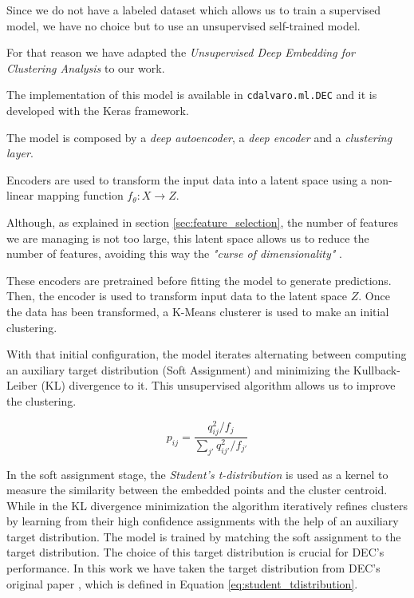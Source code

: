 \documentclass[11pt, a4paper, english]{book}
\begin{document}
Since we do not have a labeled dataset which allows us to train a supervised model, we have no choice but to use an unsupervised self-trained model.

For that reason we have adapted the \emph{Unsupervised Deep Embedding for Clustering Analysis} to our work.

The implementation of this model is available in \verb|cdalvaro.ml.DEC| and it is developed with the Keras framework.

The model is composed by a \emph{deep autoencoder}, a \emph{deep encoder} and a \emph{clustering layer}.

Encoders are used to transform the input data into a latent space using a non-linear mapping function $f_{\theta} : X \rightarrow Z$.

Although, as explained in section \ref{sec:feature_selection}, the number of features we are managing is not too large, this latent space allows us to reduce
the number of features, avoiding this way the \emph{"curse of dimensionality"} \cite{bellman1961curse}.

These encoders are pretrained before fitting the model to generate predictions. Then, the encoder is used to transform input data to the
latent space $Z$. Once the data has been transformed, a K-Means clusterer is used to make an initial clustering.

With that initial configuration, the model iterates alternating between computing an auxiliary target distribution (Soft Assignment)
and minimizing the Kullback-Leiber (KL) divergence \cite{kullback1951information} to it. This unsupervised algorithm allows us to improve
the clustering.

\begin{equation}
  p_{ij} = \frac{q^{2}_{ij} / f_{j}}{\sum_{j'}q^{2}_{ij'}/f_{j'}}
  \label{eq:student_tdistribution}
\end{equation}

In the soft assignment stage, the \emph{Student's t-distribution} is used as a kernel to measure the similarity
between the embedded points and the cluster centroid. While in the KL divergence minimization the algorithm iteratively refines clusters by learning
from their high confidence assignments with the help of an auxiliary target distribution. The model is trained by matching the soft assignment to the
target distribution. The choice of this target distribution is crucial for DEC's performance. In this work we have taken the target distribution
from DEC's original paper \cite{xie2016unsupervised}, which is defined in Equation \ref{eq:student_tdistribution}.
\end{document}
